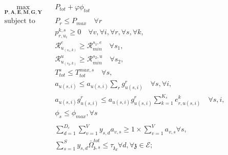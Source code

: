 \documentclass[conference]{IEEEtran}
\begin{document}
\begin{subequations}
\begin{alignat}{4}
\max\limits_{\boldsymbol{P}, \boldsymbol{A}, \boldsymbol{E}, \boldsymbol{M}, \boldsymbol{G}, \boldsymbol{Y} }   \quad &  P_{tot}+ \varphi \phi_{tot} \ \\
\text{subject to} \quad  &  P_r \leq P_{max} \quad \forall r
 \label{c11} \\
&p_{r,u_i}^{k,s}  \geq 0  \quad \forall v,\forall i,\forall r,\forall s, \forall k,\label{c12} \\
&\mathcal{R}_{u_{(s_1,k)}}^e \geq  \mathcal{R}_{min}^{s_1,e} \quad \forall s_1, \label{c13} \\
&\mathcal{R}_{u_{(s_2,k)}}^u \geq  \mathcal{R}_{min}^{s_2,u} \quad \forall s_2, \label{c14} \\
&T_{tot}^s \leq T_{tot}^{max,s} \quad \forall s,\label{c15} \\
&a_{u(s,i)} \leq a_{u(s,i)}\sum_{r}g^r_{u(s,i)}  \quad \forall s,\forall i, \label{c16}  \\
& a_{u(s,i)}g^r_{u(s,i)} \leq a_{u(s,i)}g^r_{u(s,i)}\sum_{k =1}^{K_s} e^{k}_{r,u(s,i)}  \quad \forall s,i , \label{c21} \\
& \phi_{s} \leq \phi_{max}, \forall s\\
\label{c22} \\
& \textstyle  \sum_{d=1}^{D_c}\sum_{v=1}^{V}y_{s,d}a_{v,s} \geq 1\times\sum_{v=1}^{V}a_{v,s} \forall s,\label{c23} \\
 &\textstyle \sum_{s=1}^{S} y_{s,d} \bar{\Omega}_{\mathfrak{z},s}^{tot}  \leq   \tau_{\mathfrak{z}_d}  \forall d, \forall \mathfrak{z}\in \mathcal{E}; \label{c22}
\end{alignat}
\label{constraints}
\end{subequations}





\end{document}
